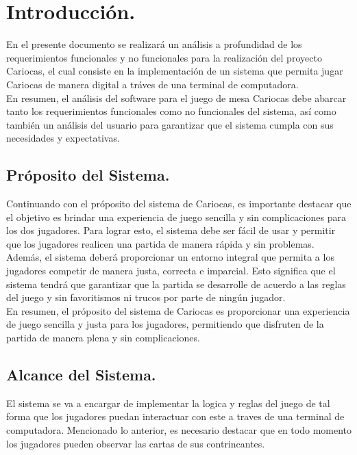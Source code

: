 
\section{Introducción.}\label{cap:intro}
En el presente documento se realizará un análisis a profundidad de los requerimientos funcionales y no funcionales para la realización del proyecto
Cariocas, el cual consiste en la implementación de un sistema que permita jugar Cariocas de manera digital a tráves de una terminal de computadora.\\



En resumen, el análisis del software para el juego de mesa Cariocas debe abarcar tanto los requerimientos funcionales como no funcionales del sistema, así como también un análisis del usuario para garantizar que el sistema cumpla con sus necesidades y expectativas.


\subsection{Próposito del Sistema.}\label{cap:proposito}
Continuando con el próposito del sistema de Cariocas, es importante destacar que el objetivo es 
brindar una experiencia de juego sencilla y sin complicaciones para los dos jugadores. Para lograr esto, 
el sistema debe ser fácil de usar y permitir que los jugadores realicen una partida de manera rápida y sin problemas.\\

Además, el sistema deberá proporcionar un entorno integral que permita a los jugadores competir de manera justa, 
correcta e imparcial. Esto significa que el sistema tendrá que garantizar que la partida se desarrolle de acuerdo a las reglas del juego y sin 
favoritismos ni trucos por parte de ningún jugador.\\

En resumen, el próposito del sistema de Cariocas es proporcionar una experiencia de juego sencilla y justa para los 
jugadores, permitiendo que disfruten de la partida de manera plena y sin complicaciones.

\subsection{Alcance del Sistema.}\label{cap:alcance}
El sistema se va a encargar de implementar la logica y reglas del juego de tal forma que los jugadores puedan
interactuar con este a traves de una terminal de computadora. Mencionado lo anterior, es necesario destacar 
que en todo momento los jugadores pueden observar las cartas de sus contrincantes.

